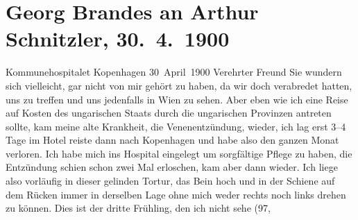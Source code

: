 

               \section[Georg Brandes an Arthur Schnitzler, 30. 4. 1900]{ Georg Brandes an Arthur Schnitzler, 30. 4. 1900}\nopagebreak{}\rehead{ }\begin{ledgroupsized}[t]{13cm}\normalsize\beginnumbering{} \toendnotes[C]{\smallbreak\pagebreak[2]} 
\toendnotes[C]{\smallbreak}\pstart
           \raggedleft{}{\pb}Kommunehospitalet\pend
           \pstart
           \raggedleft{}Kopenhagen\pend
           \pstart
           \raggedleft{}30 April 1900\pend
           \pstart{}Verehrter Freund\pend\pstart
           Sie wundern sich vielleicht, gar nicht von mir gehört zu haben, da wir doch
                    verabredet hatten, uns zu treffen und uns jedenfalls in Wien zu sehen. Aber eben wie ich eine Reise auf Kosten des
                        ungarischen
               Staats durch die ungarischen Provinzen antreten sollte, kam
                    meine alte Krankheit, die Venenentzündung, wieder, ich lag erst 3–4 Tage im
                    Hotel reiste dann nach Kopenhagen und habe
                    also den ganzen Monat verloren. Ich habe mich ins Hospital eingelegt um
                    sorgfältige Pflege zu haben, die Entzündung schien schon zwei Mal erloschen, kam
                    aber dann wieder. Ich liege also vorläufig in dieser gelinden Tortur, das Bein
                    hoch und in der Schiene {\pb}auf
                    dem Rücken immer in derselben Lage ohne mich weder rechts noch links drehen zu
                    können.\pend
           \pstart
           Dies ist der dritte Frühling, den ich nicht sehe (97,

\end{ledgroupsized}
